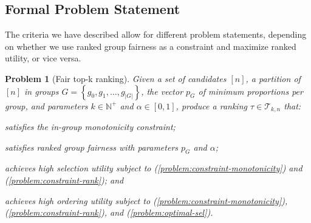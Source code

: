\subsection{Formal Problem Statement}
\label{subsec:problem-statement}
The criteria we have described allow for different problem statements, depending on whether we use ranked group fairness as a constraint and maximize ranked utility, or vice versa.

\newtheorem*{problem*}{Problem}
\begin{problem*}[Fair top-k ranking]
	Given a set of candidates $[n]$, \textcolor[rgb]{0.00,0.00,1.00}{a partition of $[n]$ in groups $G = \left\{g_0, g_1, \ldots, g_{|G|}\right\}$, the vector $p_G$ of minimum proportions per group,  and parameters $k \in \mathbb{N}^+$ and $\alpha \in [0,1]$}, produce a ranking $\tau \in {\mathcal T}_{k,n}$ that:
	\begin{compactenum}[(i)]
		\item \label{problem:constraint-monotonicity} satisfies the in-group monotonicity constraint;
		\item \label{problem:constraint-rank} satisfies ranked group fairness with parameters $p_G$ and $\alpha$;
		\item \label{problem:optimal-sel} achieves high selection utility subject to (\ref{problem:constraint-monotonicity}) and (\ref{problem:constraint-rank}); and
		\item \label{problem:maximum-ord} achieves high ordering utility subject to (\ref{problem:constraint-monotonicity}), (\ref{problem:constraint-rank}), and (\ref{problem:optimal-sel}).
	\end{compactenum}
\end{problem*}

